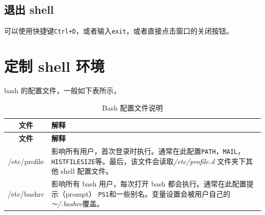 \documentclass[doctor,openright,twoside]{sjtuthesis}
\newcommand{\passthrough}[1]{#1}
\theoremstyle{plain}
\theoremstyle{definition}
\theoremstyle{remark}
\theoremstyle{ocrenumbox}
\theoremstyle{plain}
\begin{document}
\hypertarget{shell}{%
\subsection{退出 shell}\label{shell}}

可以使用快捷键\passthrough{\lstinline!Ctrl+D!}，或者输入\passthrough{\lstinline!exit!}，或者直接点击窗口的关闭按钮。

\hypertarget{shell--1}{%
\section{定制 shell 环境}\label{shell--1}}

bash 的配置文件，一般如下表所示，

\begin{longtable}[]{@{}cl@{}}
\caption{Bash 配置文件说明}\tabularnewline
\toprule
\begin{minipage}[b]{0.20\columnwidth}\centering
\textbf{文件}\strut
\end{minipage} & \begin{minipage}[b]{0.74\columnwidth}\raggedright
\textbf{解释}\strut
\end{minipage}\tabularnewline
\midrule
\endfirsthead
\toprule
\begin{minipage}[b]{0.20\columnwidth}\centering
\textbf{文件}\strut
\end{minipage} & \begin{minipage}[b]{0.74\columnwidth}\raggedright
\textbf{解释}\strut
\end{minipage}\tabularnewline
\midrule
\endhead
\begin{minipage}[t]{0.20\columnwidth}\centering
/etc/profile\strut
\end{minipage} & \begin{minipage}[t]{0.74\columnwidth}\raggedright
影响所有用户，首次登录时执行。通常在此配置\passthrough{\lstinline!PATH!}，\passthrough{\lstinline!MAIL!}，\passthrough{\lstinline!HISTFILESIZE!}等。最后，该文件会读取\emph{/etc/profile.d} 文件夹下其他 shell 配置文件。\strut
\end{minipage}\tabularnewline
\begin{minipage}[t]{0.20\columnwidth}\centering
/etc/bashrc\strut
\end{minipage} & \begin{minipage}[t]{0.74\columnwidth}\raggedright
影响所有 bash 用户，每次打开 bash 都会执行。通常在此配置提示（prompt） \passthrough{\lstinline!PS1!}和一些别名。变量设置会被用户自己的 \emph{\passthrough{\lstinline!～!}/.bashrc}覆盖。\strut

\end{minipage}
\end{longtable}
\end{document}
